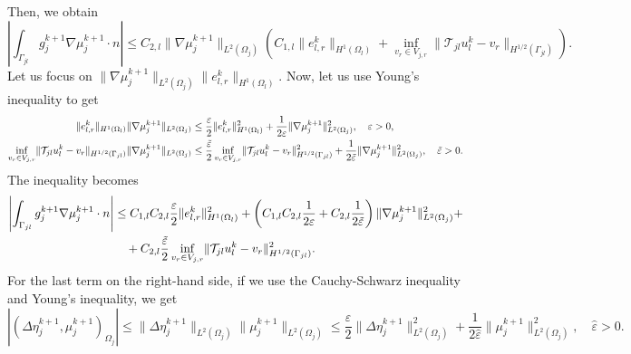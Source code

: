 \documentclass[a4paper, 11pt]{article}
\theoremstyle{plain}
\theoremstyle{definition}
\theoremstyle{remark}
\begin{document}
Then, we obtain
\begin{equation*}
    \left|\int_{\Gamma_{jl}}g_{j}^{k+1}\nabla\mu_{j}^{k+1}\cdot n\right| \leq C_{2, l}\lVert \nabla\mu_{j}^{k+1} \rVert_{L^{2}(\Omega_{j})}\left(C_{1, l} \lVert e_{l, r}^{k}\rVert_{H^{1}(\Omega_{l})} + \inf_{v_{r}\in V_{j, r}}\lVert \mathcal{T}_{jl}u_{l}^{k} -  v_{r} \rVert_{H^{1/2}(\Gamma_{jl})}\right).
\end{equation*}
Let us focus on $\lVert \nabla\mu_{j}^{k+1} \rVert_{L^{2}(\Omega_{j})} \lVert e_{l, r}^{k}\rVert_{H^{1}(\Omega_{l})}$. Now, let us use Young's inequality to get
\begin{align*}
    \lVert e_{l, r}^{k} \rVert_{H^{1}(\Omega_{l})}\lVert \nabla\mu_{j}^{k+1} \rVert_{L^{2}(\Omega_{j})} &\leq \dfrac{\varepsilon}{2}\lVert e_{l, r}^{k} \rVert^{2}_{H^{1}(\Omega_{l})} + \dfrac{1}{2\varepsilon}\lVert \nabla\mu_{j}^{k+1} \rVert^{2}_{L^{2}(\Omega_{j})}, \quad \varepsilon > 0,\\
    \inf_{v_{r}\in V_{j, r}}\lVert \mathcal{T}_{jl}u_{l}^{k} -  v_{r} \rVert_{H^{1/2}(\Gamma_{jl})}\lVert \nabla\mu_{j}^{k+1} \rVert_{L^{2}(\Omega_{j})} &\leq \dfrac{\Tilde{\varepsilon}}{2}\inf_{v_{r}\in V_{j, r}}\lVert \mathcal{T}_{jl}u_{l}^{k} -  v_{r} \rVert^{2}_{H^{1/2}(\Gamma_{jl})} + \dfrac{1}{2\Tilde{\varepsilon}}\lVert \nabla\mu_{j}^{k+1} \rVert^{2}_{L^{2}(\Omega_{j})}, \quad \Tilde{\varepsilon} > 0.
\end{align*}
The inequality becomes
\begin{align*}
    \left|\int_{\Gamma_{jl}}g_{j}^{k+1}\nabla\mu_{j}^{k+1}\cdot n\right| &\leq C_{1, l}C_{2, l}\dfrac{\varepsilon}{2}\lVert e_{l, r}^{k} \rVert^{2}_{H^{1}(\Omega_{l})} + \left(C_{1, l}C_{2, l}\dfrac{1}{2\varepsilon} + C_{2, l}\dfrac{1}{2\Tilde{\varepsilon}}\right)\lVert \nabla\mu_{j}^{k+1} \rVert^{2}_{L^{2}(\Omega_{j})} + \\
    &\quad + C_{2, l}\dfrac{\Tilde{\varepsilon}}{2}\inf_{v_{r}\in V_{j, r}}\lVert \mathcal{T}_{jl}u_{l}^{k} -  v_{r} \rVert^{2}_{H^{1/2}(\Gamma_{jl})}.
\end{align*}
For the last term on the right-hand side, if we use the Cauchy-Schwarz inequality and Young's inequality, we get 
\begin{equation*}
    \left|\left(\Delta \eta_{j}^{k+1}, \mu_{j}^{k+1}\right)_{\Omega_{j}}\right| \leq \lVert \Delta\eta_{j}^{k+1} \rVert_{L^{2}(\Omega_{j})}\lVert \mu_{j}^{k+1} \rVert_{L^{2}(\Omega_{j})} \leq \dfrac{\hat{\varepsilon}}{2}\lVert \Delta\eta_{j}^{k+1} \rVert^{2}_{L^{2}(\Omega_{j})} + \dfrac{1}{2\hat{\varepsilon}}\lVert \mu_{j}^{k+1} \rVert^{2}_{L^{2}(\Omega_{j})}, \quad \hat{\varepsilon} > 0.
\end{equation*}
\end{document}

